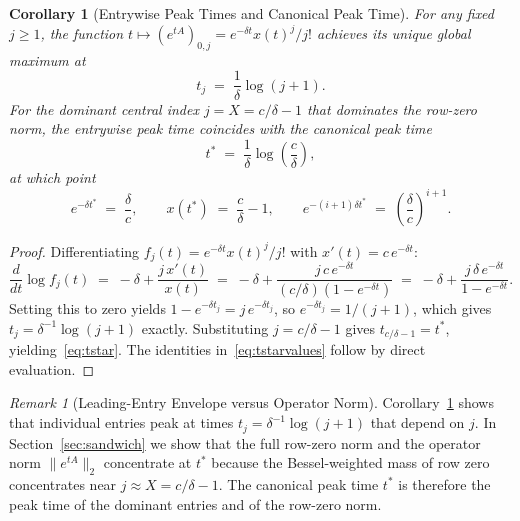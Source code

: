 \documentclass[11pt,reqno]{article}
\theoremstyle{plain}
\newtheorem{corollary}[theorem]{Corollary}
\theoremstyle{definition}
\theoremstyle{remark}
\newtheorem{remark}[theorem]{Remark}
\numberwithin{equation}{section}
\begin{document}
\begin{corollary}[Entrywise Peak Times and Canonical Peak Time]\label{cor:peaktime}
For any fixed $j \ge 1$, the function $t \mapsto (e^{tA})_{0,j} = e^{-\delta t}x(t)^j/j!$ achieves its unique global maximum at
\begin{equation}\label{eq:tj}
  t_j \;=\; \frac{1}{\delta}\log(j+1).
\end{equation}
For the dominant central index $j = X = c/\delta - 1$ that dominates the row-zero norm, the entrywise peak time coincides with the canonical peak time
\begin{equation}\label{eq:tstar}
  t^* \;=\; \frac{1}{\delta}\log\left(\frac{c}{\delta}\right),
\end{equation}
at which point
\begin{equation}\label{eq:tstarvalues}
  e^{-\delta t^*} \;=\; \frac{\delta}{c}, \qquad x(t^*) \;=\; \frac{c}{\delta} - 1, \qquad e^{-(i+1)\delta t^*} \;=\; \left(\frac{\delta}{c}\right)^{i+1}.
\end{equation}
\end{corollary}

\begin{proof}
Differentiating $f_j(t) = e^{-\delta t}x(t)^j/j!$ with $x'(t) = c\,e^{-\delta t}$:
\begin{equation}\label{eq:log_deriv_entry}
  \frac{d}{dt}\log f_j(t) \;=\; -\delta + \frac{j\,x'(t)}{x(t)} \;=\; -\delta + \frac{j\,c\,e^{-\delta t}}{(c/\delta)(1 - e^{-\delta t})} \;=\; -\delta + \frac{j\,\delta\,e^{-\delta t}}{1 - e^{-\delta t}}.
\end{equation}
Setting this to zero yields $1 - e^{-\delta t_j} = j\,e^{-\delta t_j}$, so $e^{-\delta t_j} = 1/(j+1)$, which gives $t_j = \delta^{-1}\log(j+1)$ exactly. Substituting $j = c/\delta - 1$ gives $t_{c/\delta - 1} = t^*$, yielding~\eqref{eq:tstar}. The identities in~\eqref{eq:tstarvalues} follow by direct evaluation.
\end{proof}

\begin{remark}[Leading-Entry Envelope versus Operator Norm]\label{rem:envelope}
Corollary~\ref{cor:peaktime} shows that individual entries peak at times $t_j = \delta^{-1}\log(j+1)$ that depend on $j$. In Section~\ref{sec:sandwich} we show that the full row-zero norm and the operator norm $\|e^{tA}\|_2$ concentrate at $t^*$ because the Bessel-weighted mass of row zero concentrates near $j \approx X = c/\delta - 1$. The canonical peak time $t^*$ is therefore the peak time of the dominant entries and of the row-zero norm.
\end{remark}
\end{document}
